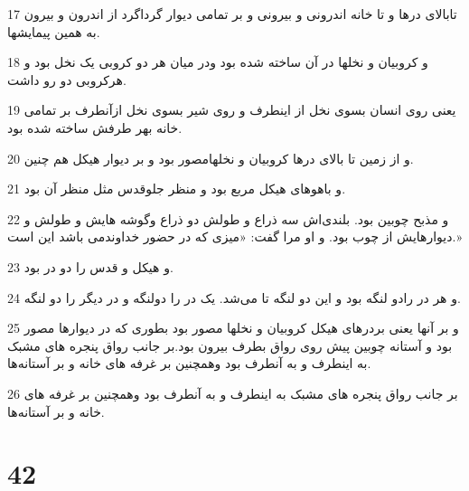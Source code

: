 \par 17 تابالای درها و تا خانه اندرونی و بیرونی و بر تمامی دیوار گرداگرد از اندرون و بیرون به همین پیمایشها.
\par 18 و کروبیان و نخلها در آن ساخته شده بود ودر میان هر دو کروبی یک نخل بود و هرکروبی دو رو داشت.
\par 19 یعنی روی انسان بسوی نخل از اینطرف و روی شیر بسوی نخل ازآنطرف بر تمامی خانه بهر طرفش ساخته شده بود.
\par 20 و از زمین تا بالای درها کروبیان و نخلهامصور بود و بر دیوار هیکل هم چنین.
\par 21 و باهوهای هیکل مربع بود و منظر جلوقدس مثل منظر آن بود.
\par 22 و مذبح چوبین بود. بلندی‌اش سه ذراع و طولش دو ذراع وگوشه هایش و طولش و دیوارهایش از چوب بود. و او مرا گفت: «میزی که در حضور خداوندمی باشد این است.»
\par 23 و هیکل و قدس را دو در بود.
\par 24 و هر در رادو لنگه بود و این دو لنگه تا می‌شد. یک در را دولنگه و در دیگر را دو لنگه.
\par 25 و بر آنها یعنی بردرهای هیکل کروبیان و نخلها مصور بود بطوری که در دیوارها مصور بود و آستانه چوبین پیش روی رواق بطرف بیرون بود.بر جانب رواق پنجره های مشبک به اینطرف و به آنطرف بود وهمچنین بر غرفه های خانه و بر آستانه‌ها.
\par 26 بر جانب رواق پنجره های مشبک به اینطرف و به آنطرف بود وهمچنین بر غرفه های خانه و بر آستانه‌ها.

\chapter{42}

